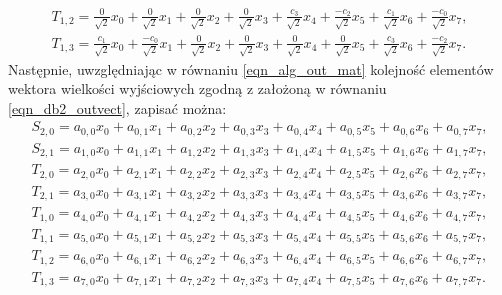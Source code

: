 \begin{gather}
T_{1,2} = \frac{0}{\sqrt{2}} x_0 + \frac{0}{\sqrt{2}} x_1 + \frac{0}{\sqrt{2}} x_2 + \frac{0}{\sqrt{2}} x_3 + \frac{c_3}{\sqrt{2}} x_4 + \frac{- c_2}{\sqrt{2}} x_5 + \frac{c_1}{\sqrt{2}} x_6 + \frac{- c_0}{\sqrt{2}} x_7 \label{eqn_db2_outvect_t_1_2_full}, \\
T_{1,3} = \frac{c_1}{\sqrt{2}} x_0 + \frac{- c_0}{\sqrt{2}} x_1 + \frac{0}{\sqrt{2}} x_2 + \frac{0}{\sqrt{2}} x_3 + \frac{0}{\sqrt{2}} x_4 + \frac{0}{\sqrt{2}} x_5 + \frac{c_3}{\sqrt{2}} x_6 + \frac{- c_2}{\sqrt{2}} x_7 \label{eqn_db2_outvect_t_1_3_full}.
\end{gather}
Następnie, uwzględniając w równaniu \eqref{eqn_alg_out_mat} kolejność elementów wektora wielkości wyjściowych zgodną z założoną w równaniu \eqref{eqn_db2_outvect}, zapisać można:
\begin{gather}
S_{2,0} = a_{0,0} x_0 + a_{0,1} x_1 + a_{0,2} x_2 + a_{0,3} x_3 + a_{0,4} x_4 + a_{0,5} x_5 + a_{0,6} x_6 + a_{0,7} x_7 \label{eqn_db2_outvect_s_2_0_row}, \\
S_{2,1} = a_{1,0} x_0 + a_{1,1} x_1 + a_{1,2} x_2 + a_{1,3} x_3 + a_{1,4} x_4 + a_{1,5} x_5 + a_{1,6} x_6 + a_{1,7} x_7 \label{eqn_db2_outvect_s_2_1_row}, \\
T_{2,0} = a_{2,0} x_0 + a_{2,1} x_1 + a_{2,2} x_2 + a_{2,3} x_3 + a_{2,4} x_4 + a_{2,5} x_5 + a_{2,6} x_6 + a_{2,7} x_7 \label{eqn_db2_outvect_t_2_0_row}, \\
T_{2,1} = a_{3,0} x_0 + a_{3,1} x_1 + a_{3,2} x_2 + a_{3,3} x_3 + a_{3,4} x_4 + a_{3,5} x_5 + a_{3,6} x_6 + a_{3,7} x_7 \label{eqn_db2_outvect_t_2_1_row}, \\
T_{1,0} = a_{4,0} x_0 + a_{4,1} x_1 + a_{4,2} x_2 + a_{4,3} x_3 + a_{4,4} x_4 + a_{4,5} x_5 + a_{4,6} x_6 + a_{4,7} x_7 \label{eqn_db2_outvect_t_1_0_row}, \\
T_{1,1} = a_{5,0} x_0 + a_{5,1} x_1 + a_{5,2} x_2 + a_{5,3} x_3 + a_{5,4} x_4 + a_{5,5} x_5 + a_{5,6} x_6 + a_{5,7} x_7 \label{eqn_db2_outvect_t_1_1_row}, \\
T_{1,2} = a_{6,0} x_0 + a_{6,1} x_1 + a_{6,2} x_2 + a_{6,3} x_3 + a_{6,4} x_4 + a_{6,5} x_5 + a_{6,6} x_6 + a_{6,7} x_7 \label{eqn_db2_outvect_t_1_2_row}, \\
T_{1,3} = a_{7,0} x_0 + a_{7,1} x_1 + a_{7,2} x_2 + a_{7,3} x_3 + a_{7,4} x_4 + a_{7,5} x_5 + a_{7,6} x_6 + a_{7,7} x_7 \label{eqn_db2_outvect_t_1_3_row}.
\end{gather}

